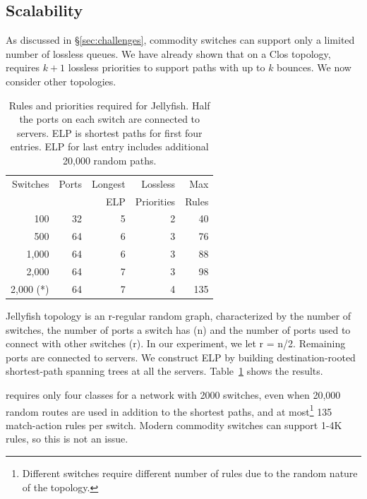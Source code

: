\subsection{Scalability}
\label{subsec:exp_overhead}

As discussed in \S\ref{sec:challenges}, commodity switches can support only a
limited number of lossless queues.  We have already shown that on a Clos
topology, \sysname{} requires $k+1$ lossless priorities to support paths with
up to $k$ bounces. We now consider other topologies.

\begin{table}[t]
		\footnotesize
	\centering
		\begin{tabular}{|r|r|r|r|r|}
			\hline
				Switches & Ports & Longest & Lossless & Max \\
						 &		 & ELP & Priorities & Rules \\
			\hline
			\hline
			100 & 32 & 5 & 2 &  40 \\
			\hline
			500 & 64 & 6 & 3 & 76 \\
			\hline
			1,000 & 64 & 6 & 3 & 88 \\
			\hline
			2,000 & 64 & 7 & 3 & 98 \\
			\hline
			2,000 (*)  & 64 & 7 & 4 &  135\\
			\hline
			
		\end{tabular}
		\caption{Rules and priorities required for Jellyfish. Half the ports on
		each switch are connected to servers. ELP is shortest paths for first four entries. ELP for last entry includes additional 20,000 random paths.}
		\vspace{-2em}
\label{table:jellyfish_shortestpath} \end{table}




Jellyfish topology is an r-regular random graph, characterized by the number of
switches, the number of ports a switch has (n) and the number of ports used to
connect with other switches (r).  In our experiment, we let r = n/2. Remaining
ports are connected to servers. We construct ELP by building destination-rooted
shortest-path spanning trees at all the servers.
Table~\ref{table:jellyfish_shortestpath} shows the results.

\sysname{} requires only four classes for a network with 2000 switches, even
when 20,000 random routes are used in addition to the shortest paths, and at
most\footnote{Different switches require different number of rules due to the
random nature of the topology.} 135 match-action rules per switch.  Modern
commodity switches can support 1-4K rules, so this is not an issue.

